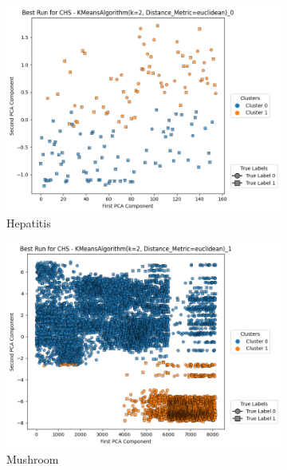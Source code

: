 \begin{figure}[H]
    \centering
    \begin{subfigure}{0.32\textwidth}
        \centering
        \includegraphics[width=\linewidth]{figures/KMeans/hepatitis_best_run_CHS.png}
        \caption{Hepatitis}
    \end{subfigure}
    \hfill
    \begin{subfigure}{0.32\textwidth}
        \centering
        \includegraphics[width=\linewidth]{figures/KMeans/mushroom_best_run_CHS.png}
        \caption{Mushroom}
    \end{subfigure}
    \hfill
    \begin{subfigure}{0.32\textwidth}
        \centering

\end{subfigure}
\end{figure}
